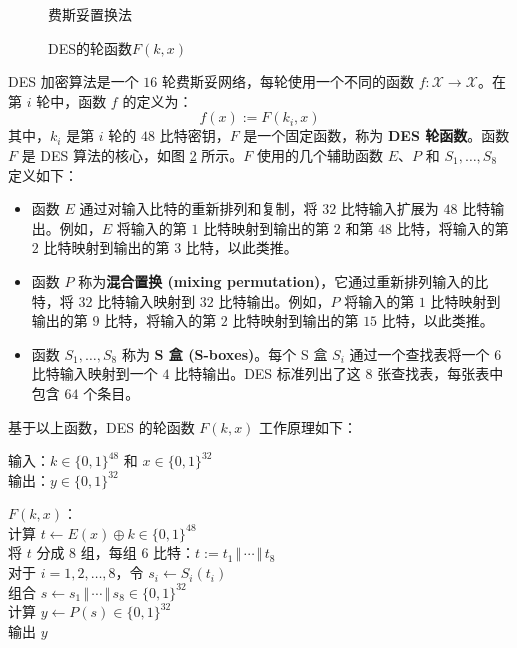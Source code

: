 \begin{figure}
  \centering
  
  \caption{费斯妥置换法}
  \label{fig:4-7}
\end{figure}

\begin{figure}[p!]
  \centering
  
  \caption{DES的轮函数$F(k,x)$}
  \label{fig:4-8}
\end{figure}

\begin{snote}
DES 加密算法是一个 $16$ 轮费斯妥网络，每轮使用一个不同的函数 $f:\mathcal{X}\to\mathcal{X}$。在第 $i$ 轮中，函数 $f$ 的定义为：
\[
f(x):=F(k_i,x)
\]
其中，$k_i$ 是第 $i$ 轮的 $48$ 比特密钥，$F$ 是一个固定函数，称为 \textbf{DES 轮函数}。函数 $F$ 是 DES 算法的核心，如图 \ref{fig:4-8} 所示。$F$ 使用的几个辅助函数 $E$、$P$ 和 $S_1,\dots,S_8$ 定义如下：
\begin{itemize}
	\item 函数 $E$ 通过对输入比特的重新排列和复制，将 $32$ 比特输入扩展为 $48$ 比特输出。例如，$E$ 将输入的第 $1$ 比特映射到输出的第 $2$ 和第 $48$ 比特，将输入的第 $2$ 比特映射到输出的第 $3$ 比特，以此类推。
	\item 函数 $P$ 称为\textbf{混合置换 (mixing permutation)}，它通过重新排列输入的比特，将 $32$ 比特输入映射到 $32$ 比特输出。例如，$P$ 将输入的第 $1$ 比特映射到输出的第 $9$ 比特，将输入的第 $2$ 比特映射到输出的第 $15$ 比特，以此类推。
	\item 函数 $S_1,\dots,S_8$ 称为 \textbf{S 盒 (S-boxes)}。每个 S 盒 $S_i$ 通过一个查找表将一个 $6$ 比特输入映射到一个 $4$ 比特输出。DES 标准列出了这 $8$ 张查找表，每张表中包含 $64$ 个条目。
\end{itemize}

\noindent
基于以上函数，DES 的轮函数 $F(k,x)$ 工作原理如下：

\vspace*{5pt}

\hspace*{5pt} 输入：$k\in\{0,1\}^{48}$ 和 $x\in\{0,1\}^{32}$\\
\hspace*{26pt} 输出：$y\in\{0,1\}^{32}$

\vspace*{5pt}

\hspace*{5pt} $F(k,x)$：\\
\hspace*{50pt} 计算 $t\leftarrow E(x)\oplus k\in\{0,1\}^{48}$\\
\hspace*{50pt} 将 $t$ 分成 $8$ 组，每组 $6$ 比特：$t:=t_1\,\Vert\,\cdots\,\Vert\,t_8$\\
\hspace*{50pt} 对于 $i=1,2,\dots,8$，令 $s_i\leftarrow S_i(t_i)$\\
\hspace*{50pt} 组合 $s\leftarrow s_1\,\Vert\,\cdots\,\Vert\,s_8\in\{0,1\}^{32}$\\
\hspace*{50pt} 计算 $y\leftarrow P(s)\in\{0,1\}^{32}$\\
\hspace*{50pt} 输出 $y$


\end{snote}

